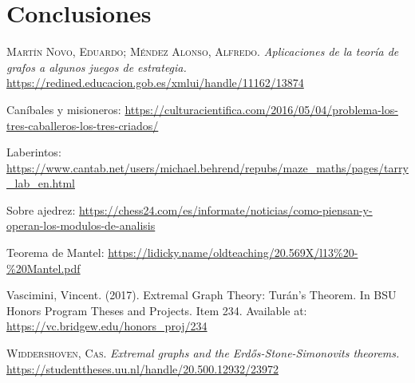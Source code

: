 \documentclass[12pt,a4paper]{book}
\begin{document}
\chapter{Conclusiones}





\begin{thebibliography}{X}
     \textsc{Martín Novo, Eduardo; Méndez Alonso, Alfredo}.
    \textit{Aplicaciones de la teoría de grafos a algunos juegos de estrategia.}
    \url{https://redined.educacion.gob.es/xmlui/handle/11162/13874}

     Caníbales y misioneros: \url{https://culturacientifica.com/2016/05/04/problema-los-tres-caballeros-los-tres-criados/}

     Laberintos: \url{https://www.cantab.net/users/michael.behrend/repubs/maze_maths/pages/tarry_lab_en.html}
    
     Sobre ajedrez: \url{https://chess24.com/es/informate/noticias/como-piensan-y-operan-los-modulos-de-analisis}

     Teorema de Mantel: \url{https://lidicky.name/oldteaching/20.569X/l13%20-%20Mantel.pdf}

     Vascimini, Vincent. (2017). Extremal Graph Theory: Turán’s Theorem. 
    In BSU Honors Program Theses and Projects. Item 234. Available at: \url{https://vc.bridgew.edu/honors_proj/234}

     \textsc{Widdershoven, Cas.} \textit{Extremal graphs and the Erd{\H{o}}s-Stone-Simonovits theorems.}
    \url{https://studenttheses.uu.nl/handle/20.500.12932/23972}

\end{thebibliography}
\end{document}
